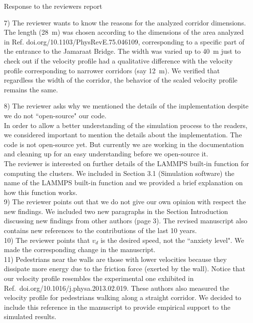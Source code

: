 \documentclass[a4paper,12pt]{letter}
\begin{document}
\begin{letter}{Response to the reviewers report}
{7) The reviewer wants to know the reasons for the analyzed corridor dimensions. 
\\

The length (28~m) was chosen according to the dimensions of the area analyzed
in Ref. doi.org/10.1103/PhysRevE.75.046109,  corresponding to a specific part 
of the entrance to the Jamaraat Bridge. 
The width was varied up to 40~m just to check out if the velocity profile had a
qualitative difference with the velocity profile corresponding to narrower 
corridors (say 12~m). We verified that regardless the width of the corridor, 
the behavior of the scaled velocity profile remains the same. 

8) The reviewer asks why we mentioned the details of the implementation despite 
we do not ``open-source" our code. \\

In order to allow a better understanding of the simulation process to the readers, we 
considered important to mention the details about the implementation. The code is not open-source yet.
But currently we are working in the documentation and cleaning up for an easy understanding before we open-source it. \\

The reviewer is interested on further details of the LAMMPS built-in function for 
computing the clusters. We included in Section 3.1 (Simulation software) the name of the LAMMPS 
built-in function and we provided a brief explanation on how this function works. \\ 

9) The reviewer points out that we do not give our own opinion with respect
the new findings. We included two new paragraphs in the Section Introduction discussing new findings from other authors (page 3). The revised manuscript also contains new references to the contributions of the last 10 years.\\



10) The reviewer points that $v_d$ is the desired speed, not the ``anxiety level". 
We made the corresponding change in the manuscript.\\

11) Pedestrians near the walls are those with lower velocities because they 
dissipate more energy due to the friction force (exerted by the wall).
Notice that our velocity profile resembles the experimental one
exhibited in  Ref.~doi.org/10.1016/j.physa.2013.02.019.
These authors also measured the velocity profile for
pedestrians walking along a straight corridor. We decided to
include this reference in the manuscript to provide empirical 
support to the simulated results. \\

}
\end{letter}
\end{document}
